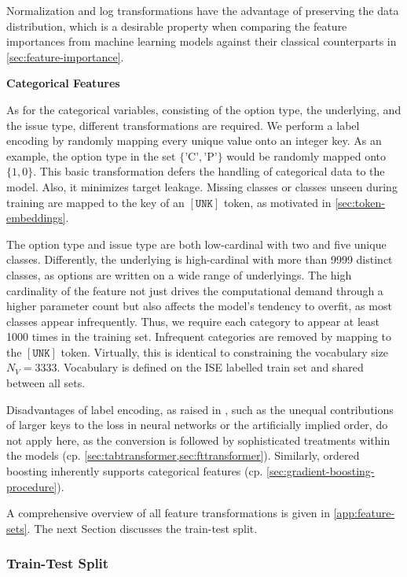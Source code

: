 Normalization and log transformations have the advantage of preserving the data distribution, which is a desirable property when comparing the feature importances from machine learning models against their classical counterparts in \cref{sec:feature-importance}.

\textbf{Categorical Features}

As for the categorical variables, consisting of the option type, the underlying, and the issue type, different transformations are required. We perform a label encoding by randomly mapping every unique value onto an integer key. As an example, the option type in the set $\{\text{'C'},\text{'P'}\}$ would be randomly mapped onto $\{1,0\}$. This basic transformation defers the handling of categorical data to the model. Also, it minimizes target leakage. Missing classes or classes unseen during training are mapped to the key of an $\mathtt{[UNK]}$ token, as motivated in \cref{sec:token-embeddings}. 

The option type and issue type are both low-cardinal with two and five unique classes. Differently, the underlying is high-cardinal with more than \num{9999} distinct classes, as options are written on a wide range of underlyings. The high cardinality of the feature not just drives the computational demand through a higher parameter count but also affects the model's tendency to overfit, as most classes appear infrequently. Thus, we require each category to appear at least \num{1000} times in the training set. Infrequent categories are removed by mapping to the $\mathtt{[UNK]}$ token. Virtually, this is identical to constraining the vocabulary size $N_V = \num{3333}$. Vocabulary is defined on the \gls{ISE} labelled train set and shared between all sets.

Disadvantages of label encoding, as raised in \textcite[][12]{hancockSurveyCategoricalData2020}, such as the unequal contributions of larger keys to the loss in neural networks or the artificially implied order, do not apply here, as the conversion is followed by sophisticated treatments within the models (cp. \cref{sec:tabtransformer,sec:fttransformer}). Similarly, ordered boosting inherently supports categorical features (cp. \cref{sec:gradient-boosting-procedure}). 

A comprehensive overview of all feature transformations is given in \cref{app:feature-sets}. The next Section discusses the train-test split.

\subsubsection{Train-Test Split}\label{sec:train-test-split}

